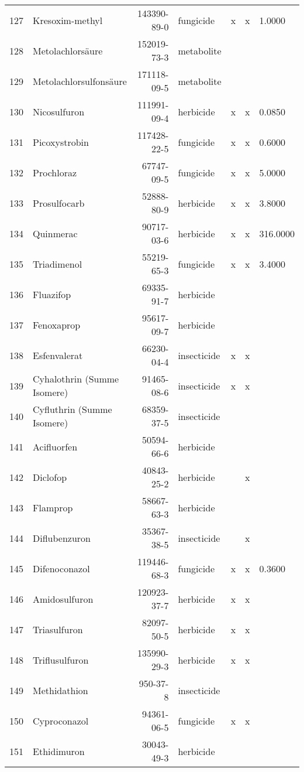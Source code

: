 \begin{longtable}{lp{3cm}rlp{0.5cm}p{0.5cm}p{1.5cm}}
  127 & Kresoxim-methyl & 143390-89-0 & fungicide & x & x & 1.0000 \\ 
  128 & Metolachlorsäure & 152019-73-3 & metabolite &  &  &  \\ 
  129 & Metolachlorsulfonsäure & 171118-09-5 & metabolite &  &  &  \\ 
  130 & Nicosulfuron & 111991-09-4 & herbicide & x & x & 0.0850 \\ 
  131 & Picoxystrobin & 117428-22-5 & fungicide & x & x & 0.6000 \\ 
  132 & Prochloraz & 67747-09-5 & fungicide & x & x & 5.0000 \\ 
  133 & Prosulfocarb & 52888-80-9 & herbicide & x & x & 3.8000 \\ 
  134 & Quinmerac & 90717-03-6 & herbicide & x & x & 316.0000 \\ 
  135 & Triadimenol & 55219-65-3 & fungicide & x & x & 3.4000 \\ 
  136 & Fluazifop & 69335-91-7 & herbicide &  &  &  \\ 
  137 & Fenoxaprop & 95617-09-7 & herbicide &  &  &  \\ 
  138 & Esfenvalerat & 66230-04-4 & insecticide & x & x &  \\ 
  139 & Cyhalothrin (Summe Isomere) & 91465-08-6 & insecticide & x & x &  \\ 
  140 & Cyfluthrin (Summe Isomere) & 68359-37-5 & insecticide &  &  &  \\ 
  141 & Acifluorfen & 50594-66-6 & herbicide &  &  &  \\ 
  142 & Diclofop & 40843-25-2 & herbicide &  & x &  \\ 
  143 & Flamprop & 58667-63-3 & herbicide &  &  &  \\ 
  144 & Diflubenzuron & 35367-38-5 & insecticide &  & x &  \\ 
  145 & Difenoconazol & 119446-68-3 & fungicide & x & x & 0.3600 \\ 
  146 & Amidosulfuron & 120923-37-7 & herbicide & x & x &  \\ 
  147 & Triasulfuron & 82097-50-5 & herbicide & x & x &  \\ 
  148 & Triflusulfuron & 135990-29-3 & herbicide & x & x &  \\ 
  149 & Methidathion & 950-37-8 & insecticide &  &  &  \\ 
  150 & Cyproconazol & 94361-06-5 & fungicide & x & x &  \\ 
  151 & Ethidimuron & 30043-49-3 & herbicide &  &  &  \\ 

\end{longtable}
